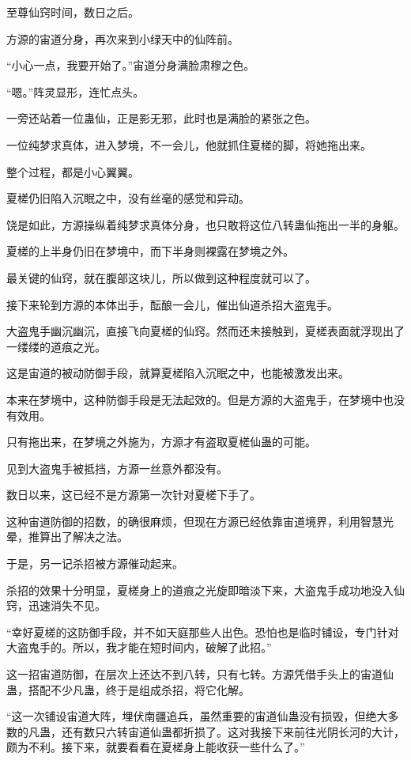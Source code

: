 
\begin{this_body}

至尊仙窍时间，数日之后。

方源的宙道分身，再次来到小绿天中的仙阵前。

“小心一点，我要开始了。”宙道分身满脸肃穆之色。

“嗯。”阵灵显形，连忙点头。

一旁还站着一位蛊仙，正是影无邪，此时也是满脸的紧张之色。

一位纯梦求真体，进入梦境，不一会儿，他就抓住夏槎的脚，将她拖出来。

整个过程，都是小心翼翼。

夏槎仍旧陷入沉眠之中，没有丝毫的感觉和异动。

饶是如此，方源操纵着纯梦求真体分身，也只敢将这位八转蛊仙拖出一半的身躯。

夏槎的上半身仍旧在梦境中，而下半身则裸露在梦境之外。

最关键的仙窍，就在腹部这块儿，所以做到这种程度就可以了。

接下来轮到方源的本体出手，酝酿一会儿，催出仙道杀招大盗鬼手。

大盗鬼手幽沉幽沉，直接飞向夏槎的仙窍。然而还未接触到，夏槎表面就浮现出了一缕缕的道痕之光。

这是宙道的被动防御手段，就算夏槎陷入沉眠之中，也能被激发出来。

本来在梦境中，这种防御手段是无法起效的。但是方源的大盗鬼手，在梦境中也没有效用。

只有拖出来，在梦境之外施为，方源才有盗取夏槎仙蛊的可能。

见到大盗鬼手被抵挡，方源一丝意外都没有。

数日以来，这已经不是方源第一次针对夏槎下手了。

这种宙道防御的招数，的确很麻烦，但现在方源已经依靠宙道境界，利用智慧光晕，推算出了解决之法。

于是，另一记杀招被方源催动起来。

杀招的效果十分明显，夏槎身上的道痕之光旋即暗淡下来，大盗鬼手成功地没入仙窍，迅速消失不见。

“幸好夏槎的这防御手段，并不如天庭那些人出色。恐怕也是临时铺设，专门针对大盗鬼手的。所以，我才能在短时间内，破解了此招。”

这一招宙道防御，在层次上还达不到八转，只有七转。方源凭借手头上的宙道仙蛊，搭配不少凡蛊，终于是组成杀招，将它化解。

“这一次铺设宙道大阵，埋伏南疆追兵，虽然重要的宙道仙蛊没有损毁，但绝大多数的凡蛊，还有数只六转宙道仙蛊都折损了。这对我接下来前往光阴长河的大计，颇为不利。接下来，就要看看在夏槎身上能收获一些什么了。”


\end{this_body}
